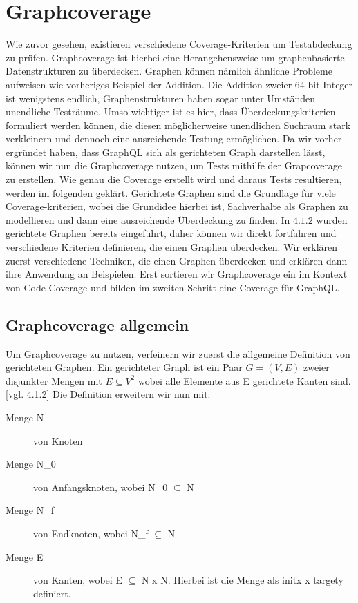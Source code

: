 \chapter{Graphcoverage}

Wie zuvor gesehen, existieren verschiedene Coverage-Kriterien um Testabdeckung zu prüfen.
Graphcoverage ist hierbei eine Herangehensweise um graphenbasierte Datenstrukturen zu überdecken.
Graphen können nämlich ähnliche Probleme aufweisen wie vorheriges Beispiel der Addition.
Die Addition zweier 64-bit Integer ist wenigstens endlich, Graphenstrukturen haben sogar unter Umständen unendliche Testräume.
Umso wichtiger ist es hier, dass Überdeckungskriterien formuliert werden können, die diesen möglicherweise unendlichen Suchraum
stark verkleinern und dennoch eine ausreichende Testung ermöglichen.
Da wir vorher ergründet haben, dass GraphQL sich als gerichteten Graph darstellen lässt, können wir nun die Graphcoverage nutzen, um Tests mithilfe der Grapcoverage zu erstellen.
Wie genau die Coverage erstellt wird und daraus Tests resultieren, werden im folgenden geklärt.
Gerichtete Graphen sind die Grundlage für viele Coverage-kriterien, wobei die Grundidee hierbei ist,
Sachverhalte als Graphen zu modellieren und dann eine ausreichende Überdeckung zu finden. \cite[vgl. Software-testing S. 27 2.1]{software-testing}
In $4.1.2$ wurden gerichtete Graphen bereits eingeführt, daher können wir direkt fortfahren und verschiedene
Kriterien definieren, die einen Graphen überdecken.
Wir erklären zuerst verschiedene Techniken, die einen Graphen überdecken und erklären dann ihre Anwendung
an Beispielen.
Erst sortieren wir Graphcoverage ein im Kontext von Code-Coverage und bilden im zweiten Schritt eine Coverage für GraphQL\@.

\section{Graphcoverage allgemein}

Um Graphcoverage zu nutzen, verfeinern wir zuerst die allgemeine Definition von gerichteten Graphen.
Ein gerichteter Graph ist ein Paar $G = (V, E)$ zweier disjunkter Mengen mit $E \subseteq V^2$ wobei alle Elemente aus E gerichtete Kanten sind. [vgl. 4.1.2]
Die Definition erweitern wir nun mit:

\begin{description}
    \item[Menge N] von Knoten
    \item[Menge N_{0}] von Anfangsknoten, wobei N_{0} $\subseteq$ N
    \item[Menge N_{f}] von Endknoten, wobei N_{f} $\subseteq$ N
    \item[Menge E] von Kanten, wobei E $\subseteq$ N x N. Hierbei ist die Menge als init{x} x target{y} definiert.
\end{description}~\cite[2.1 Overview]{software-testing}

